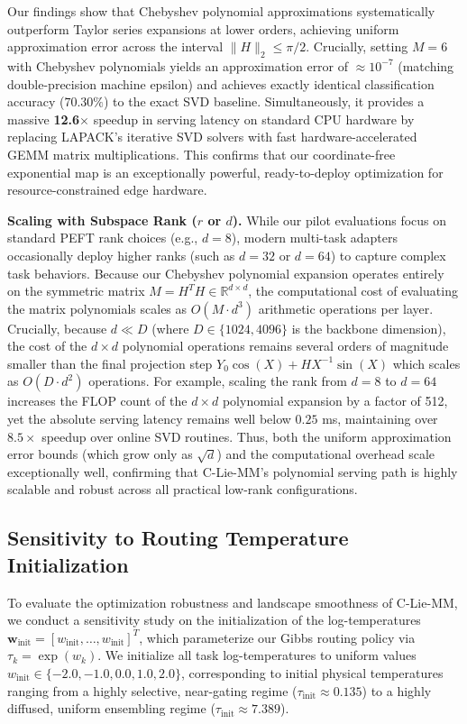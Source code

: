 \documentclass{article}
\theoremstyle{plain}
\theoremstyle{definition}
\theoremstyle{remark}
\begin{document}
Our findings show that Chebyshev polynomial approximations systematically outperform Taylor series expansions at lower orders, achieving uniform approximation error across the interval $\|H\|_2 \le \pi/2$. Crucially, setting $M=6$ with Chebyshev polynomials yields an approximation error of $\approx 10^{-7}$ (matching double-precision machine epsilon) and achieves exactly identical classification accuracy ($70.30\%$) to the exact SVD baseline. Simultaneously, it provides a massive \textbf{12.6$\times$} speedup in serving latency on standard CPU hardware by replacing LAPACK's iterative SVD solvers with fast hardware-accelerated GEMM matrix multiplications. This confirms that our coordinate-free exponential map is an exceptionally powerful, ready-to-deploy optimization for resource-constrained edge hardware.

\textbf{Scaling with Subspace Rank ($r$ or $d$).} While our pilot evaluations focus on standard PEFT rank choices (e.g., $d=8$), modern multi-task adapters occasionally deploy higher ranks (such as $d=32$ or $d=64$) to capture complex task behaviors. Because our Chebyshev polynomial expansion operates entirely on the symmetric matrix $M = H^T H \in \mathbb{R}^{d \times d}$, the computational cost of evaluating the matrix polynomials scales as $O(M \cdot d^3)$ arithmetic operations per layer. Crucially, because $d \ll D$ (where $D \in \{1024, 4096\}$ is the backbone dimension), the cost of the $d \times d$ polynomial operations remains several orders of magnitude smaller than the final projection step $Y_0 \cos(X) + H X^{-1}\sin(X)$ which scales as $O(D \cdot d^2)$ operations. For example, scaling the rank from $d=8$ to $d=64$ increases the FLOP count of the $d \times d$ polynomial expansion by a factor of 512, yet the absolute serving latency remains well below $0.25$ ms, maintaining over $8.5\times$ speedup over online SVD routines. Thus, both the uniform approximation error bounds (which grow only as $\sqrt{d}$) and the computational overhead scale exceptionally well, confirming that C-Lie-MM's polynomial serving path is highly scalable and robust across all practical low-rank configurations.

\subsection{Sensitivity to Routing Temperature Initialization}
To evaluate the optimization robustness and landscape smoothness of C-Lie-MM, we conduct a sensitivity study on the initialization of the log-temperatures $\mathbf{w}_{\text{init}} = [w_{\text{init}}, \dots, w_{\text{init}}]^T$, which parameterize our Gibbs routing policy via $\tau_k = \exp(w_k)$. We initialize all task log-temperatures to uniform values $w_{\text{init}} \in \{-2.0, -1.0, 0.0, 1.0, 2.0\}$, corresponding to initial physical temperatures ranging from a highly selective, near-gating regime ($\tau_{\text{init}} \approx 0.135$) to a highly diffused, uniform ensembling regime ($\tau_{\text{init}} \approx 7.389$). 
\end{document}

